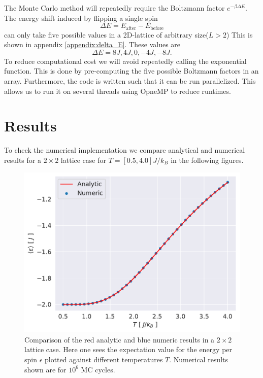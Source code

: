 \documentclass[english,notitlepage,reprint,nofootinbib]{revtex4-1}  %
\begin{document}
The Monte Carlo method will repeatedly require the Boltzmann factor $e^{-\beta \Delta E}$. The energy shift induced by flipping a single spin
\begin{equation}
    \Delta E = E_{\text{after}} - E_{\text{before}}
\end{equation}
can only take five possible values in a 2D-lattice of arbitrary size($L > 2$) This is shown in appendix \ref{appendix:delta_E}. These values are
\begin{equation}
    \Delta E = 8J, 4J, 0, -4J, -8J.
\end{equation}
To reduce computational cost we will avoid repeatedly calling the exponential function. This is done by pre-computing the five possible Boltzmann factors in an array.
Furthermore, the code is written such that it can be run parallelized. This allows us to run it on several threads using OpneMP to reduce runtimes.

\section{Results}\label{sec:results}
To check the numerical implementation we compare analytical and numerical results for a $2\times2$ lattice case for $T=[0.5,4.0]J/k_B$ in the following figures.

\begin{figure}[H]
    \centering
    \includegraphics[width=.5\textwidth]{../figures/numeric_analytic_e_T.pdf}
    \caption{Comparison of the red analytic and blue numeric results in a $2\times2$ lattice case. Here one sees the expectation value for the energy per spin $\epsilon$ plotted against different temperatures $T$. Numerical results shown are for $10^6$ MC cycles.}
    \label{fig:numeric_analytic_e_T}
\end{figure}
\end{document}
